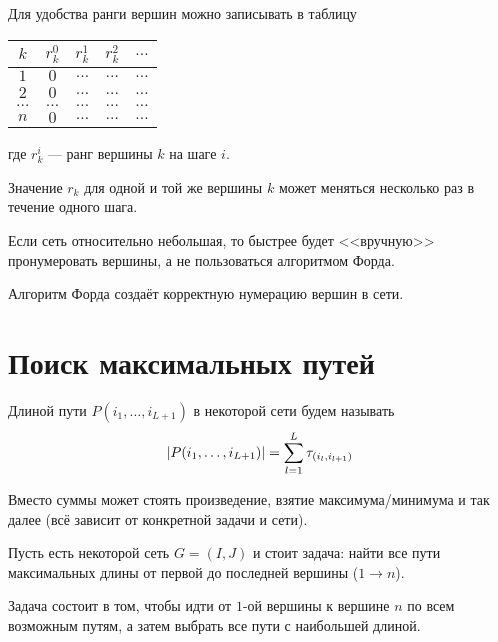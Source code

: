 Для удобства ранги вершин можно записывать в таблицу

\begin{table}[H]
	\centering
	\begin{tabular}{ | c | c | c | c | c | } 
		\hline
		$k$ & $r_k^0$ & $r_k^1$ & $r_k^2$ & $\dots$ \\\hline
		$1$ & $0$ & $\dots$ & $\dots$ & $\dots$ \\\hline
		$2$ & $0$ & $\dots$ & $\dots$ & $\dots$ \\\hline
		$\dots$ & $\dots$ & $\dots$ & $\dots$ & $\dots$ \\\hline
		$n$ & $0$ & $\dots$ & $\dots$ & $\dots$ \\\hline
	\end{tabular}
\end{table}

где $r_k^i$ --- ранг вершины $k$ на шаге $i$.

\remark

Значение $r_k$ для одной и той же вершины $k$ может меняться несколько раз в течение одного шага.

\remark

Если сеть относительно небольшая, то быстрее будет <<вручную>> пронумеровать вершины, а не пользоваться алгоритмом Форда.

\fact

Алгоритм Форда создаёт корректную нумерацию вершин в сети.

\section{Поиск максимальных путей}


Длиной пути $P(i_1, \dots, i_{L+1})$ в некоторой сети будем называть
\[
\abs{P(i_1, \dots, i_{L+1})} = \sum_{l=1}^{L} \tau_{(i_l, i_{l+1})}
\]

\remark

Вместо суммы может стоять произведение, взятие максимума/минимума и так далее (всё зависит от конкретной задачи и сети).


Пусть есть некоторой сеть $G = (I, J)$ и стоит задача: найти все пути максимальных длины от первой до последней вершины ($1 \to n$).

Задача состоит в том, чтобы идти от $1$-ой вершины к вершине $n$ по всем возможным путям, а затем выбрать все пути с наибольшей длиной.

